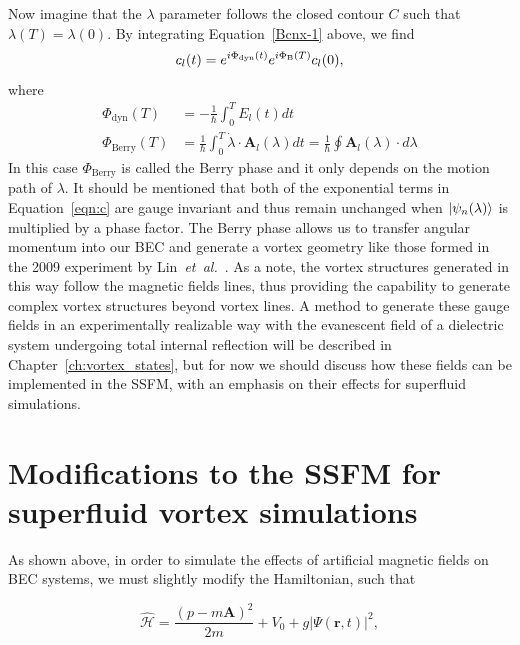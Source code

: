 Now imagine that the $\lambda$ parameter follows the closed contour $C$ such that $\lambda(T) = \lambda(0)$. 
By integrating Equation~\eqref{Bcnx-1} above, we find
\begin{equation}
c_l(t) = e^{i \Phi_{\text{dyn}}(t)}e^{i\Phi_{\text B}(T)}c_l(0),
\label{eqn:c}
\end{equation}
where
\begin{equation}
\begin{split}
\Phi_{\text{dyn}}(T) &= - \frac{1}{\hbar}\int_0^TE_l(t)dt \\
\Phi_{\text{Berry}} (T)&= \frac{1}{\hbar} \int_0 ^T \dot{\lambda} \cdot \mathbf{A}_l(\lambda)dt = \frac{1}{\hbar}\oint\mathbf{A}_l(\lambda) \cdot d\lambda
\end{split}
\end{equation}
In this case $\Phi_{\text{Berry}}$ is called the Berry phase and it only depends on the motion path of $\lambda$. 
It should be mentioned that both of the exponential terms in Equation~\eqref{eqn:c} are gauge invariant and thus remain unchanged when $\ket{\psi_n(\lambda)}$ is multiplied by a phase factor.
The Berry phase allows us to transfer angular momentum into our BEC and generate a vortex geometry like those formed in the 2009 experiment by Lin~\textit{et~al.}~\cite{lin2009}.
As a note, the vortex structures generated in this way follow the magnetic fields lines, thus providing the capability to generate complex vortex structures beyond vortex lines.
A method to generate these gauge fields in an experimentally realizable way with the evanescent field of a dielectric system undergoing total internal reflection will be described in Chapter~\ref{ch:vortex_states}, but for now we should discuss how these fields can be implemented in the SSFM, with an emphasis on their effects for superfluid simulations.

\section{Modifications to the SSFM for superfluid vortex simulations}
\label{sec:implementation}

As shown above, in order to simulate the effects of artificial magnetic fields on BEC systems, we must slightly modify the Hamiltonian, such that

\begin{equation}
\mathcal{\hat H} = \frac{(p-m\mathbf{A})^2}{2m} + V_0 + g|\Psi(\mathbf{r},t)|^2,
\end{equation}

